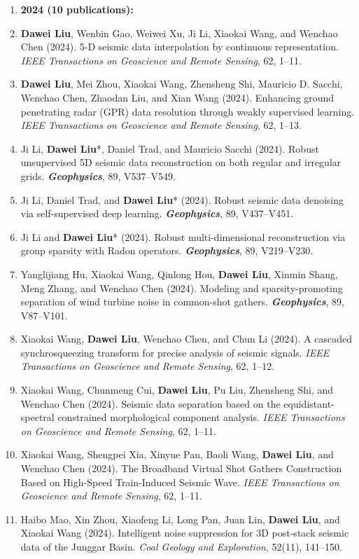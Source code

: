 \documentclass[11pt,a4paper]{article}
\begin{document}
\begin{enumerate}[leftmargin=1.5em, itemsep=0pt, topsep=2pt]
  \item[] \hspace{-25pt} \textbf{2024 (10 publications):}
    \item \textbf{Dawei Liu}, Wenbin Gao, Weiwei Xu, Ji Li, Xiaokai Wang, and Wenchao Chen (2024). 5-D seismic data interpolation by continuous representation. {\em IEEE Transactions on Geoscience and Remote Sensing}, 62, 1--11.
    \item \textbf{Dawei Liu}, Mei Zhou, Xiaokai Wang, Zhensheng Shi, Mauricio D. Sacchi, Wenchao Chen, Zhaodan Liu, and Xian Wang (2024). Enhancing ground penetrating radar (GPR) data resolution through weakly supervised learning. {\em IEEE Transactions on Geoscience and Remote Sensing}, 62, 1--13.
    \item Ji Li, \textbf{Dawei Liu}*, Daniel Trad, and Mauricio Sacchi (2024). Robust unsupervised 5D seismic data reconstruction on both regular and irregular grids. {\bf \em Geophysics}, 89, V537--V549.
    \item Ji Li, Daniel Trad, and \textbf{Dawei Liu}* (2024). Robust seismic data denoising via self-supervised deep learning. {\bf \em Geophysics}, 89, V437--V451.
    \item Ji Li and \textbf{Dawei Liu}* (2024). Robust multi-dimensional reconstruction via group sparsity with Radon operators. {\bf \em Geophysics}, 89, V219--V230.
    \item Yanglijiang Hu, Xiaokai Wang, Qinlong Hou, \textbf{Dawei Liu}, Xinmin Shang, Meng Zhang, and Wenchao Chen (2024). Modeling and sparsity-promoting separation of wind turbine noise in common-shot gathers. {\bf \em Geophysics}, 89, V87--V101.
    \item Xiaokai Wang, \textbf{Dawei Liu}, Wenchao Chen, and Chun Li (2024). A cascaded synchrosqueezing transform for precise analysis of seismic signals. {\em IEEE Transactions on Geoscience and Remote Sensing}, 62, 1--12.
    \item Xiaokai Wang, Chunmeng Cui, \textbf{Dawei Liu}, Pu Liu, Zhensheng Shi, and Wenchao Chen (2024). Seismic data separation based on the equidistant-spectral constrained morphological component analysis. {\em IEEE Transactions on Geoscience and Remote Sensing}, 62, 1--11.
    \item Xiaokai Wang, Shengpei Xia, Xinyue Pan, Baoli Wang, \textbf{Dawei Liu}, and Wenchao Chen (2024). The Broadband Virtual Shot Gathers Construction Based on High-Speed Train-Induced Seismic Wave. {\em IEEE Transactions on Geoscience and Remote Sensing}, 62, 1--11.
    \item Haibo Mao, Xin Zhou, Xiaofeng Li, Long Pan, Juan Lin, \textbf{Dawei Liu}, and Xiaokai Wang (2024). Intelligent noise suppression for 3D post-stack seismic data of the Junggar Basin. {\em Coal Geology and Exploration}, 52(11), 141--150.
    

\end{enumerate}
\end{document}
